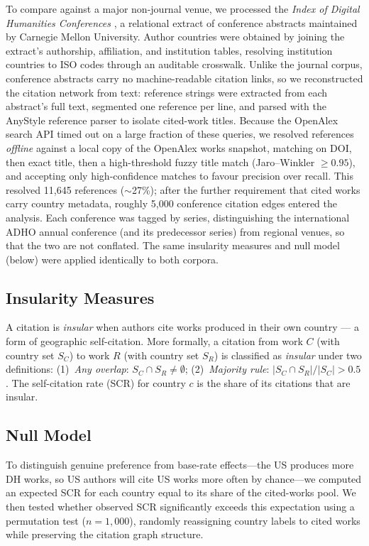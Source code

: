 \documentclass[twoside]{article}
\begin{document}
To compare against a major non-journal venue, we processed the \textit{Index of Digital Humanities Conferences} \parencite{weingart2020}, a relational extract of conference abstracts maintained by Carnegie Mellon University. Author countries were obtained by joining the extract's authorship, affiliation, and institution tables, resolving institution countries to ISO codes through an auditable crosswalk. Unlike the journal corpus, conference abstracts carry no machine-readable citation links, so we reconstructed the citation network from text: reference strings were extracted from each abstract's full text, segmented one reference per line, and parsed with the AnyStyle reference parser to isolate cited-work titles. Because the OpenAlex search API timed out on a large fraction of these queries, we resolved references \textit{offline} against a local copy of the OpenAlex works snapshot, matching on DOI, then exact title, then a high-threshold fuzzy title match (Jaro--Winkler $\geq 0.95$), and accepting only high-confidence matches to favour precision over recall. This resolved 11{,}645 references ($\sim$27\%); after the further requirement that cited works carry country metadata, roughly 5{,}000 conference citation edges entered the analysis. Each conference was tagged by series, distinguishing the international ADHO annual conference (and its predecessor series) from regional venues, so that the two are not conflated. The same insularity measures and null model (below) were applied identically to both corpora.

\subsection{Insularity Measures}

A citation is \textit{insular} when authors cite works produced in their own country — a form of geographic self-citation. More formally, a citation from work $C$ (with country set $S_C$) to work $R$ (with country set $S_R$) is classified as \textit{insular} under two definitions: (1)~\textit{Any overlap}: $S_C \cap S_R \neq \emptyset$; (2)~\textit{Majority rule}: $|S_C \cap S_R| / |S_C| > 0.5$. The self-citation rate (SCR) for country $c$ is the share of its citations that are insular.

\subsection{Null Model}

To distinguish genuine preference from base-rate effects---the US produces more DH works, so US authors will cite US works more often by chance---we computed an expected SCR for each country equal to its share of the cited-works pool. We then tested whether observed SCR significantly exceeds this expectation using a permutation test ($n = 1{,}000$), randomly reassigning country labels to cited works while preserving the citation graph structure.
\end{document}
